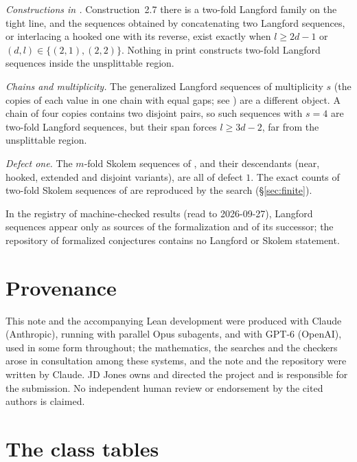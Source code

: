 \documentclass[11pt]{amsart}
\theoremstyle{plain}
\theoremstyle{definition}
\theoremstyle{remark}
\begin{document}
\emph{Constructions in \cite{ADH}.} Construction~2.7 there is a two-fold Langford family
on the tight line, and the sequences obtained by concatenating two Langford sequences,
or interlacing a hooked one with its reverse, exist exactly when $l \ge 2d-1$ or
$(d,l) \in \{(2,1),(2,2)\}$. Nothing in print constructs two-fold Langford sequences
inside the unsplittable region.

\emph{Chains and multiplicity.} The generalized Langford sequences of multiplicity $s$
(the copies of each value in one chain with equal gaps; see \cite{MMNS}) are a different
object. A chain of four copies contains two disjoint pairs, so such sequences with $s = 4$
are two-fold Langford sequences, but their span forces $l \ge 3d-2$, far from the
unsplittable region.

\emph{Defect one.} The $m$-fold Skolem sequences of \cite{BNSS}, and their descendants
(near, hooked, extended and disjoint variants), are all of defect $1$. The exact counts
of two-fold Skolem sequences of \cite{GRS} are reproduced by the search (\S\ref{sec:finite}).

In the registry of machine-checked results (read to 2026-09-27), Langford sequences appear
only as sources of the formalization \cite{gnlean} and of its successor; the repository of
formalized conjectures contains no Langford or Skolem statement.

\section*{Provenance}

This note and the accompanying Lean development were produced with Claude (Anthropic),
running with parallel Opus subagents, and with GPT-6 (OpenAI), used in some form throughout;
the mathematics, the searches and the checkers arose in consultation among these systems, and
the note and the repository were written by Claude. JD Jones owns and directed the project and
is responsible for the submission. No independent human review or endorsement by the cited
authors is claimed.

\appendix

\section{The class tables}\label{app:tables}
\end{document}
